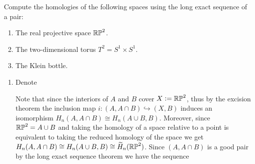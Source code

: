 \documentclass[11pt,a4paper]{article}
\begin{document}
\begin{exercise}
  \label{ex:two-seven}
  Compute the homologies of the following spaces using the long exact
  sequence of a pair:
  \begin{enumerate}
    \item[(1)] The real projective space $\mathbb{RP}^2$.
    \item[(2)] The two-dimensional torus $T^2 = S^1 \times S^1$.
    \item[(3)] The Klein bottle.
  \end{enumerate}
\end{exercise}
\begin{solution} \phantom{}
  \begin{enumerate}
    \item[(1)] Denote
      \begin{center}
      \end{center}
      Note that since the interiors of $A$ and $B$ cover $X := \mathbb{RP}^2$,
      thus by the excision theorem the inclusion map 
      $i \colon (A,A \cap B) \hookrightarrow (X,B)$ induces an isomorphism
      $H_n(A,A \cap B) \cong H_n(A \cup B, B)$.
      Moreover, since $\mathbb{RP}^2 = A \cup B$ and taking the homology of a space
      relative to a point is equivalent to taking the reduced homology of 
      the space we get
      $H_n(A,A \cap B) \cong H_n(A \cup B, B) \cong \widetilde H_n(\mathbb{RP}^2)$.
      Since $(A, A \cap B)$ is a good pair by the long exact sequence
      theorem we have the sequence
    \begin{center}

\end{center}
\end{enumerate}
\end{solution}
\end{document}
